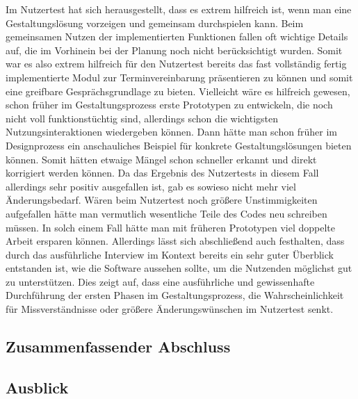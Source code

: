 Im Nutzertest hat sich herausgestellt, dass es extrem hilfreich ist, wenn man
eine Gestaltungslösung vorzeigen und gemeinsam durchspielen kann. Beim
gemeinsamen Nutzen der implementierten Funktionen fallen oft wichtige Details
auf, die im Vorhinein bei der Planung noch nicht berücksichtigt wurden. Somit
war es also extrem hilfreich für den Nutzertest bereits das fast vollständig
fertig implementierte Modul zur Terminvereinbarung präsentieren zu können und
somit eine greifbare Gesprächsgrundlage zu bieten. Vielleicht wäre es hilfreich
gewesen, schon früher im Gestaltungsprozess erste Prototypen zu entwickeln, die
noch nicht voll funktionstüchtig sind, allerdings schon die wichtigsten
Nutzungsinteraktionen wiedergeben können. Dann hätte man schon früher im
Designprozess ein anschauliches Beispiel für konkrete Gestaltungslösungen
bieten können. Somit hätten etwaige Mängel schon schneller erkannt und direkt
korrigiert werden können. Da das Ergebnis des Nutzertests in diesem Fall
allerdings sehr positiv ausgefallen ist, gab es sowieso nicht mehr viel
Änderungsbedarf. Wären beim Nutzertest noch größere Unstimmigkeiten aufgefallen
hätte man vermutlich wesentliche Teile des Codes neu schreiben müssen. In solch
einem Fall hätte man mit früheren Prototypen viel doppelte Arbeit ersparen
können. Allerdings lässt sich abschließend auch festhalten, dass durch das
ausführliche Interview im Kontext bereits ein sehr guter Überblick entstanden
ist, wie die Software aussehen sollte, um die Nutzenden möglichst gut zu
unterstützen. Dies zeigt auf, dass eine ausführliche und gewissenhafte
Durchführung der ersten Phasen im Gestaltungsprozess, die Wahrscheinlichkeit
für Missverständnisse oder größere Änderungswünschen im Nutzertest senkt.

\subsection{Zusammenfassender Abschluss}
\label{subsection:conclusion}

\subsection{Ausblick}
\label{subsection:outlook}

